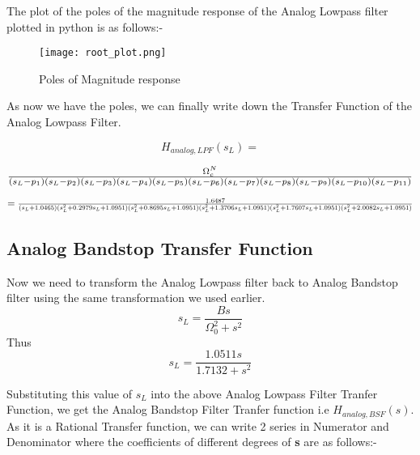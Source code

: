 \documentclass[12pt]{article}
\begin{document}
\newpage

The plot of the poles of the magnitude response of the Analog Lowpass filter plotted in python is as follows:-

\begin{figure}[H]
    \centering
    \texttt{[image: root\_plot.png]}
    \caption{Poles of Magnitude response}
\end{figure}

As now we have the poles, we can finally write down the Transfer Function of the Analog Lowpass Filter.

\[H_{analog,LPF}(s_{L}) = \]

\[\scalebox{1.2}{$\frac{\Omega_{c}^N}{(s_{L}-p_{1})(s_{L}-p_{2})(s_{L}-p_{3})(s_{L}-p_{4})(s_{L}-p_{5})(s_{L}-p_{6})(s_{L}-p_{7})(s_{L}-p_{8})(s_{L}-p_{9})(s_{L}-p_{10})(s_{L}-p_{11})}$}\]

\[= \scalebox{0.9}{$\frac{1.6487}{(s_{L}+1.0465)(s_{L}^2+0.2979s_{L}+1.0951)(s_{L}^2+0.8695s_{L}+1.0951)(s_{L}^2+1.3706s_{L}+1.0951)(s_{L}^2+1.7607s_{L}+1.0951)(s_{L}^2+2.0082s_{L}+1.0951)}$}\]

\newpage

\subsection{Analog Bandstop Transfer Function}

Now we need to transform the Analog Lowpass filter back to Analog Bandstop filter using the same transformation we used earlier.
\[s_{L} = \frac{Bs}{\Omega_{0}^2 + s^2}\]
Thus
\[s_{L} = \frac{1.0511s}{1.7132 + s^2}\]

Substituting this value of $s_{L}$ into the above Analog Lowpass Filter Tranfer Function, we get the Analog Bandstop Filter Tranfer function i.e \textbf{$H_{analog,BSF}(s)$}. As it is a Rational Transfer function, we can write 2 series in Numerator and Denominator where the coefficients of different degrees of \textbf{s} are as follows:-
\end{document}
